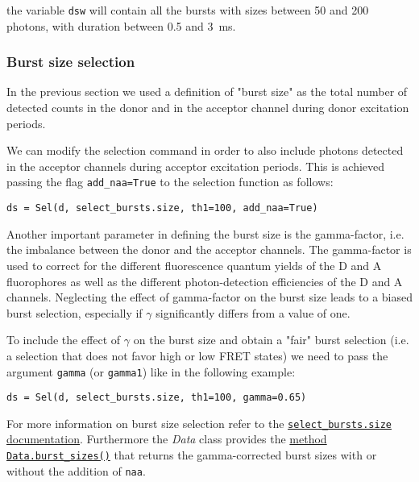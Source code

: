 the variable \verb|dsw| will contain all the bursts with sizes between 50 and
200 photons, with duration between 0.5 and 3~ms.

\subsubsection{Burst size selection}

In the previous section we used a definition of "burst size" as the total number
of detected counts in the donor and in the acceptor channel during donor
excitation periods. 

We can modify the selection command in order to also include photons detected in
the acceptor channels during acceptor excitation periods. This is achieved
passing the flag \verb|add_naa=True| to the selection function as
follows:

\begin{verbatim}
ds = Sel(d, select_bursts.size, th1=100, add_naa=True)
\end{verbatim}

Another important parameter in defining the burst size is the gamma-factor, i.e.
the imbalance between the donor and the acceptor channels. The gamma-factor is
used to correct for the different fluorescence quantum yields of the D and A fluorophores as well as the different photon-detection efficiencies of the D and A channels.
Neglecting the effect of gamma-factor on the burst size leads to a biased burst
selection, especially if $\gamma$ significantly differs from a value of one. 

To include the effect of $\gamma$ on the burst size and obtain a "fair" burst
selection (i.e. a selection that does not favor high or low FRET states) we
need to pass the argument \verb|gamma| (or \verb|gamma1|) like in the following
example:

\begin{verbatim}
ds = Sel(d, select_bursts.size, th1=100, gamma=0.65)
\end{verbatim}

For more information on burst size selection refer to the
\href{http://fretbursts.readthedocs.org/en/latest/burst_selection.html#fretbursts.select\_bursts.size}{\texttt{select\_bursts.size} documentation}. Furthermore the \textit{Data} class provides the
\href{http://fretbursts.readthedocs.org/en/latest/data_class.html#fretbursts.burstlib.Data.burst_sizes}{method \texttt{Data.burst\_sizes()}} that returns the gamma-corrected burst sizes with or
without the addition of \verb|naa|.


